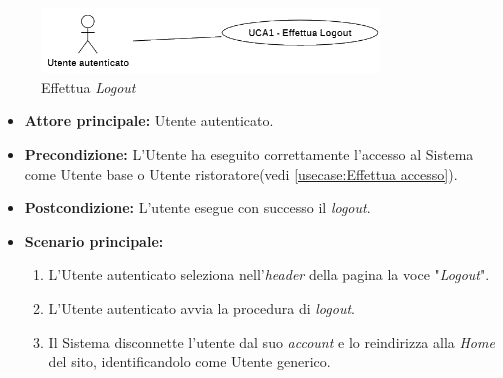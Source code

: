 \newpage
{}
\label{usecase:Effettua Logout}

\begin{figure}[h]
	\centering
	\includegraphics[width=0.8\textwidth]{./uml/UCA1.png} 
	\caption{Effettua \textit{Logout}}
	\label{fig:UCA1}
  \end{figure}

\begin{itemize}
	\item \textbf{Attore principale:} Utente autenticato.

	\item \textbf{Precondizione:} L'Utente ha eseguito correttamente l'accesso al Sistema come Utente base o Utente ristoratore(vedi \autoref{usecase:Effettua accesso}).

	\item \textbf{Postcondizione:} L'utente esegue con successo il \textit{logout}.

	\item \textbf{Scenario principale:}
	      \begin{enumerate}
		      \item L'Utente autenticato seleziona nell'\textit{header} della pagina la voce "\textit{Logout}".
		      \item L'Utente autenticato avvia la procedura di \textit{logout}.
              \item Il Sistema disconnette l'utente dal suo \textit{account} e lo reindirizza alla \textit{Home} del sito, identificandolo come Utente generico.
	      \end{enumerate}
\end{itemize}
